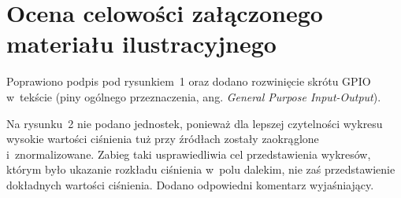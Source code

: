 \documentclass[12pt]{article}
\begin{document}
\section{Ocena celowości załączonego materiału ilustracyjnego}

Poprawiono podpis pod rysunkiem~1 oraz dodano rozwinięcie skrótu GPIO w~tekście
(piny ogólnego przeznaczenia, ang. \textit{General Purpose Input-Output}).

Na rysunku~2 nie podano jednostek, ponieważ dla lepszej czytelności wykresu
wysokie wartości ciśnienia tuż przy źródłach zostały zaokrąglone
i~znormalizowane. Zabieg taki usprawiedliwia cel przedstawienia wykresów,
którym było ukazanie rozkładu ciśnienia w~polu dalekim, nie zaś przedstawienie
dokładnych wartości ciśnienia. Dodano odpowiedni komentarz wyjaśniający.

%
%
%
%
\end{document}

